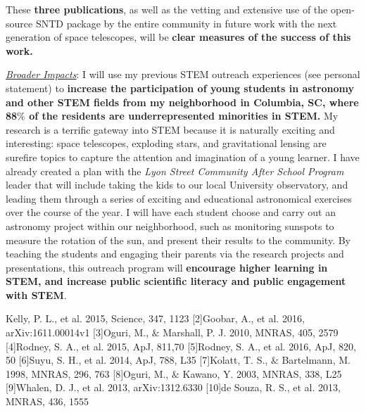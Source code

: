 These \textbf{three publications}, as well as the vetting and
extensive use of the open-source SNTD package by the entire community
in future work with the next generation of space telescopes, will
be \textbf{clear measures of the success of this work.}


\noindent\underline{\textit{Broader Impacts}}:
I will use my previous STEM outreach experiences (see personal
statement) to \textbf{increase the participation of young students in
astronomy and other STEM fields from my neighborhood in Columbia, SC,
where 88$\%$ of the residents are underrepresented minorities in
STEM.}  My research is a terrific gateway into STEM because it is
naturally exciting and interesting: space telescopes, exploding stars,
and gravitational lensing are surefire topics to capture the attention
and imagination of a young learner. I have already created a plan with
the \textit{Lyon Street Community After School Program} leader that
will include taking the kids to our local University observatory, and
leading them through a series of exciting and educational astronomical
exercises over the course of the year. I will have each student choose
and carry out an astronomy project within our neighborhood, such as
monitoring sunspots to measure the rotation of the sun, and present
their results to the community. By teaching the students and engaging
their parents via the research projects and presentations, this outreach
program will \textbf{ encourage higher learning in STEM, and increase
public scientific literacy and public engagement with STEM}.

\noindent\fontsize{10}{14}\selectfont
[1]Kelly, P. L., et al. 2015, Science, 347, 1123 [2]Goobar, A., et
al. 2016, arXiv:1611.00014v1 [3]Oguri, M., $\&$ Marshall, P. J. 2010,
MNRAS, 405, 2579 [4]Rodney, S. A., et al. 2015, ApJ, 811,70
[5]Rodney, S. A., et al. 2016, ApJ, 820, 50 [6]Suyu, S. H., et
al. 2014, ApJ, 788, L35 [7]Kolatt, T. S., $\&$ Bartelmann, M. 1998,
MNRAS, 296, 763 [8]Oguri, M., $\&$ Kawano, Y. 2003, MNRAS, 338, L25
[9]Whalen, D. J., et al. 2013, arXiv:1312.6330 [10]de Souza, R. S., et al. 2013, MNRAS, 436, 1555
\pagebreak




